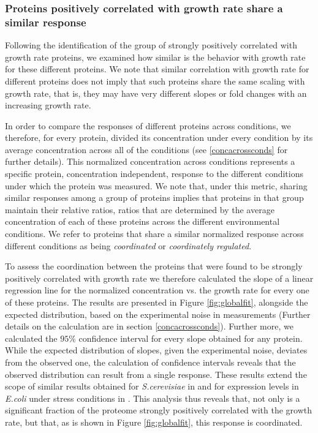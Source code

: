 \documentclass[notitlepage]{article}
\begin{document}
\subsubsection{Proteins positively correlated with growth rate share a similar response}
\label{propchange}
Following the identification of the group of strongly positively correlated with growth rate proteins, we examined how similar is the behavior with growth rate for these different proteins.
We note that similar correlation with growth rate for different proteins does not imply that such proteins share the same scaling with growth rate, that is,  they may have very different slopes or fold changes with an increasing growth rate.

In order to compare the responses of different proteins across conditions, we therefore, for every protein, divided its concentration under every condition by its average concentration across all of the conditions (see \ref{concacrossconds} for further details).
This normalized concentration across conditions represents a specific protein, concentration independent, response to the different conditions under which the protein was measured.
We note that, under this metric, sharing similar responses among a group of proteins implies that proteins in that group maintain their relative ratios, ratios that are determined by the average concentration of each of these proteins across the different environmental conditions.
We refer to proteins that share a similar normalized response across different conditions as being \emph{coordinated} or \emph{coordinately regulated}.

To assess the coordination between the proteins that were found to be strongly positively correlated with growth rate we therefore calculated the slope of a linear regression line for the normalized concentration vs. the growth rate for every one of these proteins.
The results are presented in Figure \ref{fig:globalfit}, alongside the expected distribution, based on the experimental noise in measurements (Further details on the calculation are in section \ref{concacrossconds}).
Further more, we calculated the $95\%$ confidence interval for every slope obtained for any protein.
While the expected distribution of slopes, given the experimental noise, deviates from the observed one, the calculation of confidence intervals reveals that the observed distribution can result from a single response.
These results extend the scope of similar results obtained for \emph{S.cerevisiae} in \cite{Keren2013a} and for expression levels in \emph{E.coli} under stress conditions in \cite{Kaneko2014}.
This analysis thus reveals that, not only is a significant fraction of the proteome strongly positively correlated with the growth rate, but that, as is shown in Figure \ref{fig:globalfit}, this response is coordinated.
\end{document}
